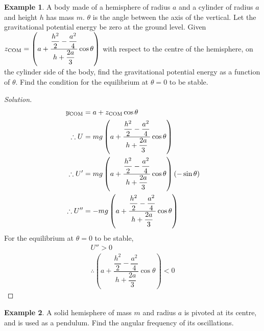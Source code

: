 \documentclass[fleqn, a4paper, 12pt]{article}
\theoremstyle{definition}
\newtheorem{example}{Example}
\theoremstyle{theorem}
\newenvironment{solution}
{\begin{proof}[Solution]\let\qed\relax}
	{\end{proof}}
\begin{document}
\begin{example}
	A body made of a hemisphere of radius $a$ and a cylinder of radius $a$ and height $h$ has mass $m$. $\theta$ is the angle between the axis of the vertical. Let the gravitational potential energy be zero at the ground level. Given $z_{\textnormal{COM}} = \left( a + \dfrac{\dfrac{h^2}{2} - \dfrac{a^2}{4}}{h + \dfrac{2a}{3}} \cos \theta \right)$ with respect to the centre of the hemisphere, on the cylinder side of the body, find the gravitational potential energy as a function of $\theta$. Find the condition for the equilibrium at $\theta = 0$ to be stable.
	\begin{figure}[H]
	\end{figure}
\end{example}

\begin{solution}
	\begin{align*}
		y_{\textnormal{COM}} &= a + z_{\textnormal{COM}} \cos \theta\\
		\therefore U &= m g \left( a + \dfrac{\dfrac{h^2}{2} - \dfrac{a^2}{4}}{h + \dfrac{2a}{3}} \cos \theta \right)\\
		\therefore U' &= m g \left( a + \dfrac{\dfrac{h^2}{2} - \dfrac{a^2}{4}}{h + \dfrac{2a}{3}} \cos \theta \right) (- \sin \theta)\\
		\therefore U'' &= - m g \left( a + \dfrac{\dfrac{h^2}{2} - \dfrac{a^2}{4}}{h + \dfrac{2a}{3}} \cos \theta \right)
	\end{align*}
	For the equilibrium at $\theta = 0$ to be stable,
	\begin{align*}
		U'' > 0\\
		\therefore \left( a + \dfrac{\dfrac{h^2}{2} - \dfrac{a^2}{4}}{h + \dfrac{2a}{3}} \cos \theta \right) < 0
	\end{align*}
\end{solution}

\begin{example}
	A solid hemisphere of mass $m$ and radius $a$ is pivoted at its centre, and is used as a pendulum. Find the angular frequency of its oscillations.
\end{example}
\end{document}
